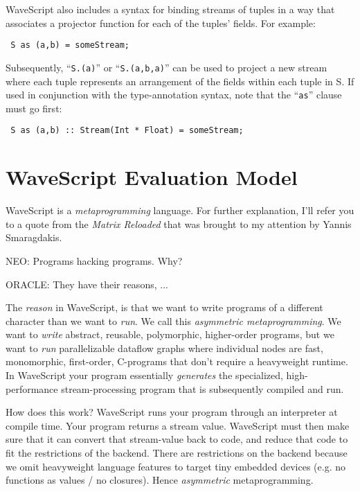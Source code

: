 \documentclass[twocolumn]{report}
\newenvironment{wscode}{\begin{center}\tt}{\end{center}}
\begin{document}
WaveScript also includes a syntax for binding streams of tuples in a
 way that associates a projector function for each of
the tuples' fields.  For example:

\begin{wscode}
S as (a,b) = someStream;
\end{wscode}

Subsequently, ``{\tt S.(a)}'' or ``{\tt S.(a,b,a)}'' can be used to
project a new stream where each tuple represents an arrangement of
the fields within each tuple in {S}.  If used in conjunction with the
type-annotation syntax, note that the ``{\tt as}'' clause must go first:

\begin{wscode}
S as (a,b) :: Stream(Int * Float) = someStream;
\end{wscode}








\chapter{WaveScript Evaluation Model}
\label{s:evalmodel}

WaveScript is a {\em metaprogramming} language.  For further
explanation, I'll refer you to a quote from the {\em Matrix Reloaded}
that was brought to my attention by Yannis Smaragdakis.

\begin{center}
NEO: Programs hacking programs. Why?

ORACLE: They have their reasons, ...
\end{center}

The {\em reason} in WaveScript, is that we want to write programs of a
different character than we want to {\em run}.  We call this {\em asymmetric metaprogramming}.
We want to {\em write}
abstract, reusable, polymorphic, higher-order programs, but we want to
{\em run} parallelizable dataflow graphs where individual nodes are
fast, monomorphic, first-order, C-programs that don't require
a heavyweight runtime.
In WaveScript your program essentially {\em
generates} the specialized, high-performance stream-processing
program that is subsequently compiled and run.  


How does this work?  
WaveScript runs your program through an interpreter at compile time.
Your program returns a stream value.  WaveScript must then make sure
that it can convert that stream-value back to code, and reduce that
code to fit the restrictions of the backend.  There are restrictions
on the backend because we omit heavyweight language features to target
tiny embedded devices (e.g. no functions as values / no closures).
Hence {\em asymmetric} metaprogramming.
\end{document}
